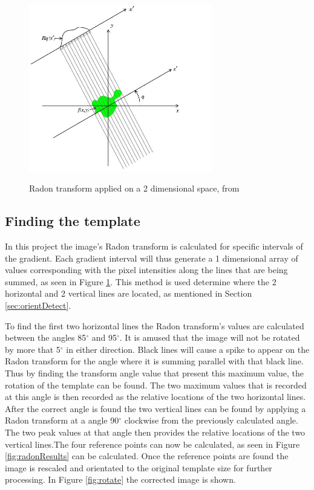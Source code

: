 \begin{figure}
  \centering
  \includegraphics[width=8cm]{RadonT}\\
  \caption{Radon transform applied on a 2 dimensional space, from \citet{radon}}
  \label{fig:RadonT}
\end{figure}

\subsection{Finding the template}
\label{sec:findTemplate}

In this project the image's Radon transform is calculated for specific intervals of the gradient. Each gradient interval will thus generate a 1 dimensional array of values corresponding with the pixel intensities along the lines that are being summed, as seen in Figure \ref{fig:RadonT}. This method is used determine where the 2 horizontal and 2 vertical lines are located, as mentioned in Section \ref{sec:orientDetect}. 

To find the first two horizontal lines the Radon transform's values are calculated between the angles 85$^{\circ}$ and 95$^{\circ}$. It is amused that the image will not be rotated by more that 5$^{\circ}$ in either direction. Black lines will cause a spike to appear on the Radon transform for the angle where it is summing parallel with that black line. Thus by finding the transform angle value that present this maximum value, the rotation of the template can be found. The two maximum values that is recorded at this angle is then recorded as the relative locations of the two horizontal lines. After the correct angle is found the two vertical lines can be found by applying a Radon transform at a angle 90$^{\circ}$ clockwise from the previously calculated angle. The two peak values at that angle then provides the relative locations of the two vertical lines.The four reference points can now be calculated, as seen in Figure \ref{fig:radonResults} can be calculated. Once the reference points are found the image is rescaled and orientated to the original template size for further processing. In Figure \ref{fig:rotate} the corrected image is shown.


